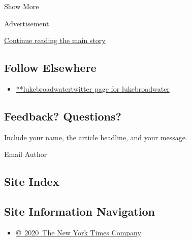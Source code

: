 Show More

Advertisement

\protect\hyperlink{after-mid2}{Continue reading the main story}

\hypertarget{follow-elsewhere}{%
\subsection{Follow Elsewhere}\label{follow-elsewhere}}

\begin{itemize}
\tightlist
\item
  \href{https://twitter.com/lukebroadwater}{**lukebroadwatertwitter page
  for lukebroadwater}
\end{itemize}

\hypertarget{feedback-questions}{%
\subsection{Feedback? Questions?}\label{feedback-questions}}

Include your name, the article headline, and your message.

Email Author

\hypertarget{site-index}{%
\subsection{Site Index}\label{site-index}}

\hypertarget{site-information-navigation}{%
\subsection{Site Information
Navigation}\label{site-information-navigation}}

\begin{itemize}
\tightlist
\item
  \href{https://help.nytimes3xbfgragh.onion/hc/en-us/articles/115014792127-Copyright-notice}{©~2020~The
  New York Times Company}
\end{itemize}


